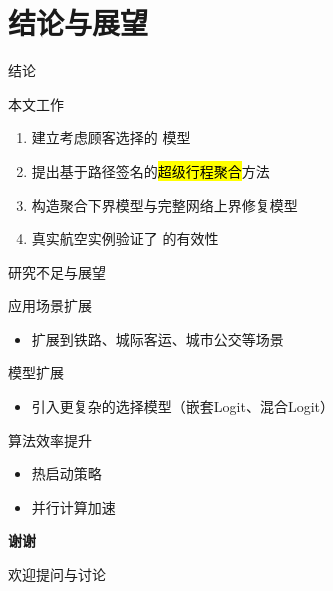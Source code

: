 \section{结论与展望}

\begin{frame}{结论}
\begin{block}{本文工作}
\begin{enumerate}
    \item<1-> 建立考虑顾客选择的 \problemNotation{} 模型
    \item<1-> 提出基于路径签名的\hl{超级行程聚合}方法
    \item<2-> 构造聚合下界模型与完整网络上界修复模型
    \item<2-> 真实航空实例验证了 \algoNotation{} 的有效性
\end{enumerate}
\end{block}

\vspace{0.3cm}
\end{frame}


\begin{frame}{研究不足与展望}
\begin{block}{应用场景扩展}
\begin{itemize}
    \item 扩展到铁路、城际客运、城市公交等场景
\end{itemize}
\end{block}

\vspace{0.2cm}
\begin{block}{模型扩展}
\begin{itemize}
    \item 引入更复杂的选择模型（嵌套Logit、混合Logit）
\end{itemize}
\end{block}

\vspace{0.2cm}
\begin{block}{算法效率提升}
\begin{itemize}
    \item 热启动策略
    \item 并行计算加速
\end{itemize}
\end{block}
\end{frame}


\begin{frame}{}
\vfill
\begin{center}
{\Huge \textcolor{structure}{\textbf{谢谢}}}

\vspace{0.5cm}
{\large 欢迎提问与讨论}
\end{center}
\vfill
\end{frame}
